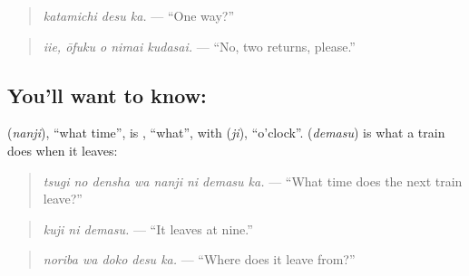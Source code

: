 \begin{quote}
\textbf{}
\end{quote}

\begin{quote}
\emph{katamichi desu ka.} — \textquotedblleft{}One way?\textquotedblright{}
\end{quote}

\begin{quote}
\textbf{  }
\end{quote}

\begin{quote}
\emph{iie, ōfuku o nimai kudasai.} — \textquotedblleft{}No, two returns, please.\textquotedblright{}
\end{quote}

\subsection*{You'll want to know:  }
\textbf{} (\emph{nanji}), \textquotedblleft{}what time\textquotedblright{}, is \textbf{}, \textquotedblleft{}what\textquotedblright{}, with \textbf{} (\emph{ji}), \textquotedblleft{}o'clock\textquotedblright{}. \textbf{} (\emph{demasu}) is what a train does when it leaves:

\begin{quote}
\textbf{   }
\end{quote}

\begin{quote}
\emph{tsugi no densha wa nanji ni demasu ka.} — \textquotedblleft{}What time does the next train leave?\textquotedblright{}
\end{quote}

\begin{quote}
\textbf{ }
\end{quote}

\begin{quote}
\emph{kuji ni demasu.} — \textquotedblleft{}It leaves at nine.\textquotedblright{}
\end{quote}

\begin{quote}
\textbf{ }
\end{quote}

\begin{quote}
\emph{noriba wa doko desu ka.} — \textquotedblleft{}Where does it leave from?\textquotedblright{}
\end{quote}

